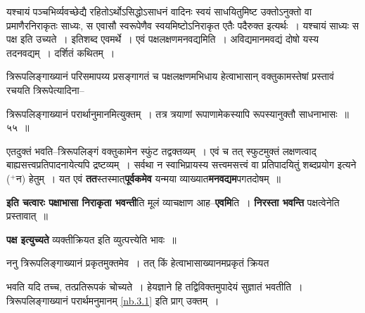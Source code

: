 \documentclass[article,12pt,a4paper]{memoir}
\newcommand{\add}[1]{($^{+}$#1)}
\begin{document}
	यश्चायं पञ्चभिर्व्यवच्छेद्यै रहितोऽर्थोऽसिद्धोऽसाधनं वादिनः स्वयं साधयितुमिष्ट उक्तोऽनुक्तो वा प्रमाणैरनिराकृतः साध्यः, स एवासौ स्वरूपेणैव स्वयमिष्टोऽनिराकृत एतैः पदैरुक्त इत्यर्थः । यश्चायं साध्यः स पक्ष इति उच्यते । इतिशब्द एवमर्थे । एवं पक्षलक्षणमनवद्यमिति । अविद्यमानमवद्यं दोषो यस्य तदनवद्यम् । दर्शितं कथितम् ।  
	  
	त्रिरूपलिङ्गाख्यानं परिसमापय्य प्रसङ्गागतं च पक्षलक्षणमभिधाय हेत्वाभासान् वक्तुकामस्तेषां प्रस्तावं रचयति त्रिरूपेत्यादिना--  
	  
	त्रिरूपलिङ्गाख्यानं परार्थानुमानमित्युक्तम् । तत्र त्रयाणां रूपाणामेकस्यापि रूपस्यानुक्तौ साधनाभासः ॥ ५५ ॥ 
	  
	एतदुक्तं भवति--त्रिरूपलिङ्गं वक्तुकामेन स्फुंट तद्वक्तव्यम् । एवं च तत् स्फुटमुक्तं लक्षणत्वाद् बाह्यसत्त्वप्रतिपादनायेत्यपि द्रष्टव्यम् । सर्वथा न स्वाभिप्रायस्य सत्त्वमसत्त्वं वा प्रतिपादयितुं शब्दप्रयोग इत्यने \add{न} हेतुम् । यत एवं \textbf{तत}स्तस्मात्\textbf{पूर्वकमेव} यन्मया व्याख्यात\textbf{मनवद्यम}पगतदोषम् ॥
	\pend
      

	  \pstart \textbf{इति चत्वारः पक्षाभासा निराकृता भवन्ती}ति मूलं व्याचक्षाण आह--\textbf{एवमि}ति । \textbf{निरस्ता भवन्ति} पक्षत्वेनेति प्रस्तावात् ॥
	\pend
      

	  \pstart \textbf{पक्ष इत्युच्यते} व्यक्तीक्रियत इति व्युत्पत्त्येति भावः ॥
	\pend
      

	  \pstart ननु त्रिरूपलिङ्गाख्यानं प्रकृतमुक्तमेव । तत् किं हेत्वाभासाख्यानमप्रकृतं क्रियत  \leavevmode{} 
	  
	भवति यदि तच्च, तत्प्रतिरूपकं चोच्यते । हेयज्ञाने हि तद्विविक्तमुपादेयं सुज्ञातं भवतीति । त्रिरूपलिङ्गाख्यानं परार्थमनुमानम् \cref{nb.3.1} इति प्राग् उक्तम् ।  
	  
\end{document}
